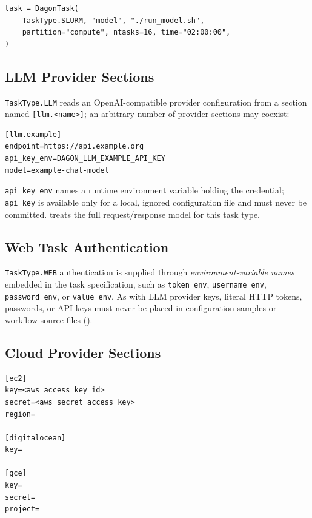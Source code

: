 \begin{lstlisting}
task = DagonTask(
    TaskType.SLURM, "model", "./run_model.sh",
    partition="compute", ntasks=16, time="02:00:00",
)
\end{lstlisting}

\subsection{LLM Provider Sections}
\label{sec:config-llm}

\texttt{TaskType.LLM} reads an OpenAI-compatible provider configuration from
a section named \texttt{[llm.<name>]}; an arbitrary number of provider
sections may coexist:

\begin{lstlisting}[style=ini]
[llm.example]
endpoint=https://api.example.org
api_key_env=DAGON_LLM_EXAMPLE_API_KEY
model=example-chat-model
\end{lstlisting}

\texttt{api\_key\_env} names a runtime environment variable holding the
credential; \texttt{api\_key} is available only for a local, ignored
configuration file and must never be committed. 
treats the full request/response model for this task type.

\subsection{Web Task Authentication}

\texttt{TaskType.WEB} authentication is supplied through
\emph{environment-variable names} embedded in the task specification, such as
\texttt{token\_env}, \texttt{username\_env}, \texttt{password\_env}, or
\texttt{value\_env}. As with LLM provider keys, literal HTTP tokens,
passwords, or API keys must never be placed in configuration samples or
workflow source files ().

\subsection{Cloud Provider Sections}

\begin{lstlisting}[style=ini]
[ec2]
key=<aws_access_key_id>
secret=<aws_secret_access_key>
region=

[digitalocean]
key=

[gce]
key=
secret=
project=
\end{lstlisting}

